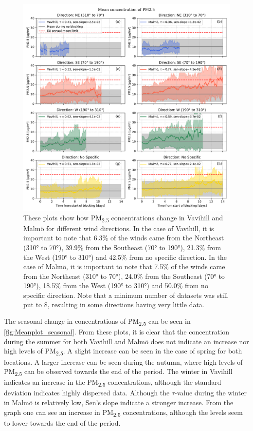\begin{figure}[H]
    \centering
    \includegraphics[width=\textwidth]{Figures/Meanplot_dir.pdf}
    \caption{These plots show how PM\textsubscript{2.5} concentrations change in Vavihill and Malmö for different wind directions. In the case of Vavihill, it is important to note that 6.3\% of the winds came from the Northeast (310° to 70°), 39.9\% from the Southeast (70° to 190°), 21.3\% from the West (190° to 310°) and 42.5\% from no specific direction. In the case of Malmö, it is important to note that 7.5\% of the winds came from the Northeast (310° to 70°), 24.0\% from the Southeast (70° to 190°), 18.5\% from the West (190° to 310°) and 50.0\% from no specific direction. Note that a minimum number of datasets was still put to 8, resulting in some directions having very little data.}
    \label{fig:Meanplot_wind}
\end{figure}


The seasonal change in concentrations of PM\textsubscript{2.5} can be seen in \autoref{fig:Meanplot_seasonal}. From these plots, it is clear that the concentration during the summer for both Vavihill and Malmö does not indicate an increase nor high levels of PM\textsubscript{2.5}. A slight increase can be seen in the case of spring for both locations. A larger increase can be seen during the autumn, where high levels of PM\textsubscript{2.5} can be observed towards the end of the period. The winter in Vavihill indicates an increase in the PM\textsubscript{2.5} concentrations, although the standard deviation indicates highly dispersed data. Although the $\tau$-value during the winter in Malmö is relatively low, Sen's slope indicate a stronger increase. From the graph one can see an increase in PM\textsubscript{2.5} concentrations, although the levels seem to lower towards the end of the period.

